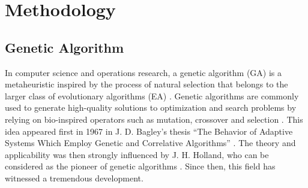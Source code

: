 \documentclass[preprint,12pt]{elsarticle}
\newtheorem{problem}{Problem}
\begin{document}
\section{Methodology}
\subsection{Genetic Algorithm}
In computer science and operations research, a genetic algorithm (GA) is a metaheuristic inspired by the process of natural selection that belongs to the larger class of evolutionary algorithms (EA) \cite{darwin2008origin}. Genetic algorithms are commonly used to generate high-quality solutions to optimization and search problems by relying on bio-inspired operators such as mutation, crossover and selection \cite{mitchell1998introduction}. This idea appeared first in 1967 in J. D. Bagley’s thesis “The Behavior of Adaptive Systems Which Employ Genetic and Correlative Algorithms” \cite{bagley1967behavior}. The theory and applicability was then strongly influenced by J. H. Holland, who can be considered as the pioneer of genetic algorithms \cite{holland1992adaptation,holland1989induction}. Since then, this field has witnessed a tremendous development.


\end{document}
